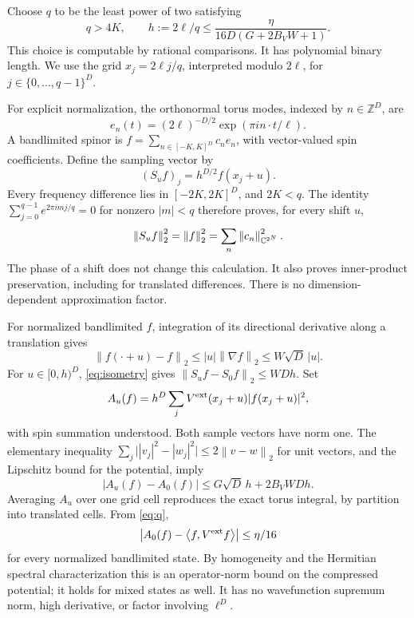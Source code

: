 \documentclass[11pt]{article}
\theoremstyle{remark}\newtheorem{remark}[theorem]{Remark}
\newcommand{\norm}[1]{\left\lVert#1\right\rVert}
\newcommand{\ip}[2]{\left\langle#1,#2\right\rangle}
\numberwithin{equation}{section}
\begin{document}
Choose $q$ to be the least power of two satisfying
\begin{equation}\label{eq:q}
 q>4K,\qquad h:=2\ell/q\leq
 \frac{\eta}{16D(G+2B_VW+1)}.
\end{equation}
This choice is computable by rational comparisons. It has polynomial
binary length. We use the grid $x_j=2\ell j/q$, interpreted modulo $2\ell$,
for $j\in\{0,\ldots,q-1\}^D$.

For explicit normalization, the orthonormal torus modes, indexed by $n\in\mathbb Z^D$, are
\[
 e_n(t)=(2\ell)^{-D/2}\exp(\pi i n\cdot t/\ell).
\]
A bandlimited spinor is $f=\sum_{n\in[-K,K]^D}c_ne_n$, with vector-valued
spin coefficients. Define the sampling vector by
\[
 (S_uf)_j=h^{D/2}f(x_j+u).
\]
Every frequency difference lies in $[-2K,2K]^D$, and $2K<q$.
The identity $\sum_{j=0}^{q-1}e^{2\pi i mj/q}=0$ for nonzero
$|m|<q$ therefore proves, for every shift $u$,
\begin{equation}\label{eq:isometry}
 \norm{S_uf}_2^2=\norm f_2^2=\sum_n\norm{c_n}_{\C^{2^N}}^2.
\end{equation}
The phase of a shift does not change this calculation. It also proves
inner-product preservation, including for translated differences. There is
no dimension-dependent approximation factor.

For normalized bandlimited $f$, integration of its directional derivative
along a translation gives
\[
 \norm{f(\cdot+u)-f}_2\leq |u|\norm{\nabla f}_2
 \leq W\sqrt D\,|u|.
\]
For $u\in[0,h)^D$, \eqref{eq:isometry} gives
$\norm{S_uf-S_0f}_2\leq WDh$.
Set
\[
 A_u(f)=h^D\sum_j V^{\rm ext}(x_j+u)|f(x_j+u)|^2,
\]
with spin summation understood. Both sample vectors have norm one.
The elementary inequality
$\sum_j\bigl||v_j|^2-|w_j|^2\bigr|\leq2\norm{v-w}_2$
for unit vectors, and the Lipschitz bound for the potential, imply
\begin{equation}\label{eq:shift}
 |A_u(f)-A_0(f)|\leq G\sqrt D\,h+2B_VWDh.
\end{equation}
Averaging $A_u$ over one grid cell reproduces the exact torus integral,
by partition into translated cells. From \eqref{eq:q},
\begin{equation}\label{eq:quadrature}
 \left|A_0(f)-\ip f{V^{\rm ext}f}\right|\leq\eta/16
\end{equation}
for every normalized bandlimited state. By homogeneity and the Hermitian
spectral characterization this is an operator-norm bound on the compressed
potential; it holds for mixed states as well. It has no wavefunction
supremum norm, high derivative, or factor involving $\ell^D$.
\end{document}
